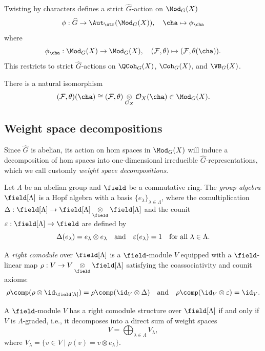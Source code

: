 \begin{defn}


Twisting by characters defines a strict $\widehat{G}$-action on $\Mod_G(X)$
$$
\phi:\widehat{G}\rightarrow\Aut_{\str}(\Mod_G(X)),
\quad
\cha\mapsto \phi_{\cha}
$$
where
$$
\phi_{\cha}:\Mod_G(X)\rightarrow\Mod_G(X),
\quad
(\mathcal{F},\theta)
\mapsto
(\mathcal{F},\theta(\cha)).
$$
This restricts to strict $\widehat{G}$-actions on
$\QCoh_G(X)$, $\Coh_G(X)$, and $\VB_G(X)$.
\end{defn}




\begin{rmk}
There is a natural isomorphism
$$
(\mathcal{F},\theta)(\cha)
\cong
(\mathcal{F},\theta)
\underset{\mathcal{O}_X}{\otimes}
\mathcal{O}_X(\cha)
\in\Mod_G(X).
$$
\end{rmk}


\subsection{Weight space decompositions} Since $\widehat{G}$ is abelian, its action on hom spaces in $\Mod_G (X)$ will induce a decomposition of hom spaces into one-dimensional irreducible $\widehat{G}$-representations, which we call customly \emph{weight space decompositions}.

\begin{defn}
Let $\Lambda$ be an abelian group and $\field$ be a commutative ring.
The \emph{group algebra} $\field[\Lambda]$ is a Hopf algebra with a basis $\{e_\lambda\}_{\lambda \in \Lambda}$,
where the comultiplication $\Delta : \field[\Lambda] \rightarrow \field[\Lambda] \underset{\field}{\otimes} \field[\Lambda]$ and the counit $\varepsilon : \field[\Lambda] \rightarrow \field$ are defined by
$$
\Delta(e_\lambda) = e_\lambda \otimes e_\lambda \quad \text{and} \quad \varepsilon(e_\lambda) = 1
\quad\textnormal{for all $\lambda \in \Lambda$}.
$$

A \emph{right comodule} over $\field[\Lambda]$ is a $\field$-module $V$ equipped with a $\field$-linear map $\rho : V \rightarrow V \underset{\field}{\otimes} \field[\Lambda]$ satisfying the coassociativity and counit axioms:
$$
\rho \comp (\rho \otimes \id_{\field[\Lambda]}) = \rho \comp (\id_V \otimes \Delta)
\quad\text{and}\quad
\rho \comp (\id_V \otimes \varepsilon) = \id_V.
$$
\end{defn}

\begin{prop}
\label{prop:WeightSpaceDecompositionForComodule}
A $\field$-module $V$ has a right comodule structure over $\field[\Lambda]$ if and only if $V$ is $\Lambda$-graded, i.e., it decomposes into a direct sum of weight spaces
$$
V = \bigoplus_{\lambda \in \Lambda} V_\lambda,
$$
where $V_\lambda = \{v \in V \mid \rho(v) = v \otimes e_\lambda\}$.
\end{prop}

